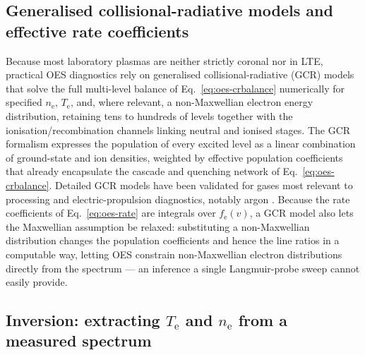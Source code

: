 \subsection{Generalised collisional-radiative models and effective rate coefficients}

Because most laboratory plasmas are neither strictly coronal nor in LTE, practical OES diagnostics rely on generalised collisional-radiative (GCR) models that solve the full multi-level balance of Eq.~\eqref{eq:oes-crbalance} numerically for specified $n_{\mathrm{e}}$, $T_{\mathrm{e}}$, and, where relevant, a non-Maxwellian electron energy distribution, retaining tens to hundreds of levels together with the ionisation/recombination channels linking neutral and ionised stages. The GCR formalism expresses the population of every excited level as a linear combination of ground-state and ion densities, weighted by effective population coefficients that already encapsulate the cascade and quenching network of Eq.~\eqref{eq:oes-crbalance}. Detailed GCR models have been validated for gases most relevant to processing and electric-propulsion diagnostics, notably argon \cite{ref0260,ref0290}. Because the rate coefficients of Eq.~\eqref{eq:oes-rate} are integrals over $f_{\mathrm{e}}(v)$, a GCR model also lets the Maxwellian assumption be relaxed: substituting a non-Maxwellian distribution changes the population coefficients and hence the line ratios in a computable way, letting OES constrain non-Maxwellian electron distributions directly from the spectrum \cite{ref0290} — an inference a single Langmuir-probe sweep cannot easily provide.

\subsection{Inversion: extracting \texorpdfstring{$T_{\mathrm{e}}$}{Te} and \texorpdfstring{$n_{\mathrm{e}}$}{ne} from a measured spectrum}

